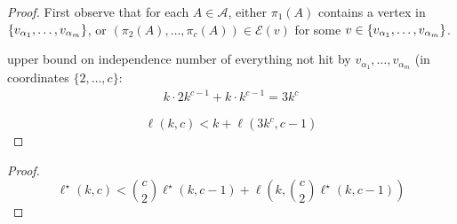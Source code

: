 \documentclass{patmorin}
\DeclarePairedDelimiter\set{\{}{\}}
\begin{document}
\begin{proof}
First observe that for each $A\in\mathcal{A}$, 
either $\pi_1(A)$ contains a vertex in $\set{v_{\alpha_1},\ldots,v_{\alpha_m}}$, or
$(\pi_2(A),\ldots,\pi_c(A))\in \mathcal{E}(v)$ for some $v\in\set{v_{\alpha_1},\ldots,v_{\alpha_m}}$. 




upper bound on independence number of everything not hit by $v_{\alpha_1},\ldots,v_{\alpha_m}$ (in coordinates $\{2,\ldots,c\}$:
\begin{align*}
k \cdot 2k^{c-1} + k\cdot k^{c-1} = 3k^{c}
\end{align*}


\[
\ell(k,c) < k + \ell(3k^c,c-1)
\]



\end{proof}

\hungarians*
\begin{proof}
\[
\textstyle\ell^\star(k,c) < \binom{c}{2}\ell^\star(k,c-1) + \ell(k,\binom{c}{2}\ell^\star(k,c-1))
\]
\end{proof}
\end{document}
